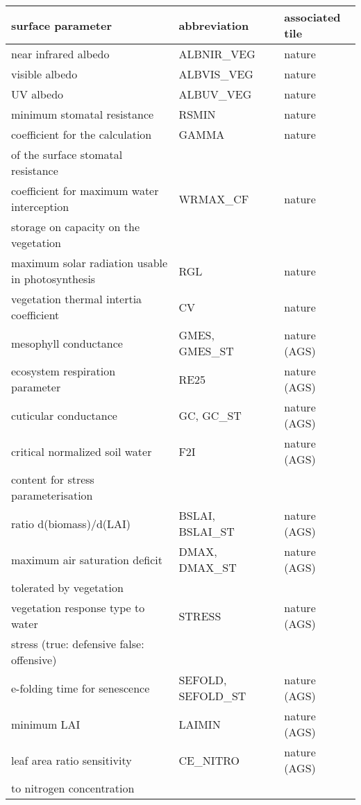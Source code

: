 \begin{table}[h]
\begin{center}
\begin{tabular}{|l|l|l| }
\hline
\textbf{surface parameter} & \textbf{abbreviation} & \textbf{associated tile} \\
\hline
near infrared albedo &  ALBNIR\_VEG & nature \\
\hline
visible albedo &  ALBVIS\_VEG & nature \\
\hline
UV albedo & ALBUV\_VEG & nature \\
\hline
minimum stomatal resistance & RSMIN & nature \\
\hline
coefficient for the calculation & GAMMA & nature \\
of the surface stomatal resistance & & \\
\hline
coefficient for maximum water interception & WRMAX\_CF & nature \\
storage on capacity on the vegetation & & \\
\hline
maximum solar radiation usable in photosynthesis & RGL & nature \\
\hline
vegetation thermal intertia coefficient & CV & nature \\
\hline
mesophyll conductance & GMES, GMES\_ST & nature (AGS)\\
\hline
ecosystem respiration parameter & RE25 & nature (AGS)\\
\hline
cuticular conductance & GC, GC\_ST & nature (AGS)\\
\hline
critical normalized soil water & F2I & nature (AGS)\\
content for stress parameterisation & & \\
\hline
ratio d(biomass)/d(LAI) & BSLAI, BSLAI\_ST & nature (AGS)\\
\hline
maximum air saturation deficit & DMAX, DMAX\_ST & nature (AGS)\\
tolerated by vegetation & & \\
\hline
vegetation response type to water & STRESS & nature (AGS)\\
stress (true: defensive false: offensive) & & \\
\hline
e-folding time for senescence & SEFOLD, SEFOLD\_ST & nature (AGS)\\
\hline
minimum LAI & LAIMIN & nature (AGS)\\
\hline
leaf area ratio sensitivity & CE\_NITRO & nature (AGS)\\
to nitrogen concentration & & \\

\end{tabular}
\end{center}
\end{table}
